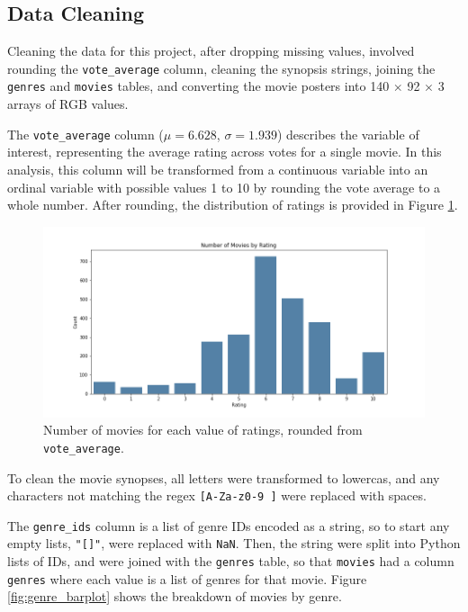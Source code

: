 \documentclass[12pt, oneside]{article}   	%
\begin{document}
\subsection{Data Cleaning}

Cleaning the data for this project, after dropping missing values, involved rounding the \texttt{vote\_average} column, cleaning the synopsis strings, joining the \texttt{genres} and \texttt{movies} tables, and converting the movie posters into 140 $\times$ 92 $\times$ 3 arrays of RGB values.

The \texttt{vote\_average} column ($\mu = 6.628$, $\sigma = 1.939$) describes the variable of interest, representing the average rating across votes for a single movie. In this analysis, this column will be transformed from a continuous variable into an ordinal variable with possible values 1 to 10 by rounding the vote average to a whole number. After rounding, the distribution of ratings is provided in Figure \ref{fig:rating_barplot}.

\begin{figure}%
\includegraphics[width=\textwidth]{rating_barplot}
\caption{\label{fig:rating_barplot}Number of movies for each value of ratings, rounded from \texttt{vote\_average}.}
\end{figure}

To clean the movie synopses, all letters were transformed to lowercas, and any characters not matching the regex \texttt{[A-Za-z0-9 ]} were replaced with spaces.

The \texttt{genre\_ids} column is a list of genre IDs encoded as a string, so to start any empty lists, \texttt{"[]"}, were replaced with \texttt{NaN}. Then, the string were split into Python lists of IDs, and were joined with the \texttt{genres} table, so that \texttt{movies} had a column \texttt{genres} where each value is a list of genres for that movie. Figure \ref{fig:genre_barplot} shows the breakdown of movies by genre.
\end{document}
